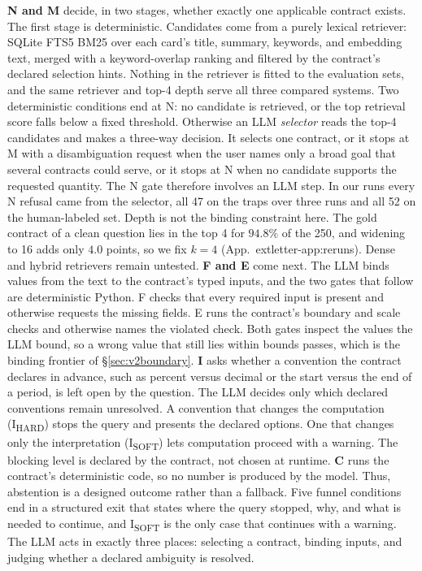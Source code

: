 \documentclass[sigconf]{acmart}
\newif\ifarxiv
\newcommand{\extref}[1]{App.~\ifarxiv\ref{#1}\else\csname extletter-#1\endcsname\fi}
\begin{document}
\textbf{N and M} decide, in two stages, whether exactly one applicable contract exists. The first stage is deterministic. Candidates come from a purely lexical retriever: SQLite FTS5 BM25 over each card's title, summary, keywords, and embedding text, merged with a keyword-overlap ranking and filtered by the contract's declared selection hints. Nothing in the retriever is fitted to the evaluation sets, and the same retriever and top-4 depth serve all three compared systems.
Two deterministic conditions end at N: no candidate is retrieved, or the top retrieval score falls below a fixed threshold. Otherwise an LLM \emph{selector} reads the top-4 candidates and makes a three-way decision. It selects one contract, or it stops at M with a disambiguation request when the user names only a broad goal that several contracts could serve, or it stops at N when no candidate supports the requested quantity. The N gate therefore involves an LLM step. In our runs every N refusal came from the selector, all 47 on the traps over three runs and all 52 on the human-labeled set.
Depth is not the binding constraint here. The gold contract of a clean question lies in the top 4 for $94.8\%$ of the 250, and widening to 16 adds only $4.0$ points, so we fix $k{=}4$ (\extref{app:reruns}). Dense and hybrid retrievers remain untested.
\textbf{F and E} come next. The LLM binds values from the text to the contract's typed inputs, and the two gates that follow are deterministic Python. F checks that every required input is present and otherwise requests the missing fields. E runs the contract's boundary and scale checks and otherwise names the violated check. Both gates inspect the values the LLM bound, so a wrong value that still lies within bounds passes, which is the binding frontier of \S\ref{sec:v2boundary}.
\textbf{I} asks whether a convention the contract declares in advance, such as percent versus decimal or the start versus the end of a period, is left open by the question. The LLM decides only which declared conventions remain unresolved. A convention that changes the computation (I\textsubscript{HARD}) stops the query and presents the declared options. One that changes only the interpretation (I\textsubscript{SOFT}) lets computation proceed with a warning. The blocking level is declared by the contract, not chosen at runtime.
\textbf{C} runs the contract's deterministic code, so no number is produced by the model.
Thus, abstention is a designed outcome rather than a fallback. Five funnel conditions end in a structured exit that states where the query stopped, why, and what is needed to continue, and I\textsubscript{SOFT} is the only case that continues with a warning. The LLM acts in exactly three places: selecting a contract, binding inputs, and judging whether a declared ambiguity is resolved.
\end{document}
